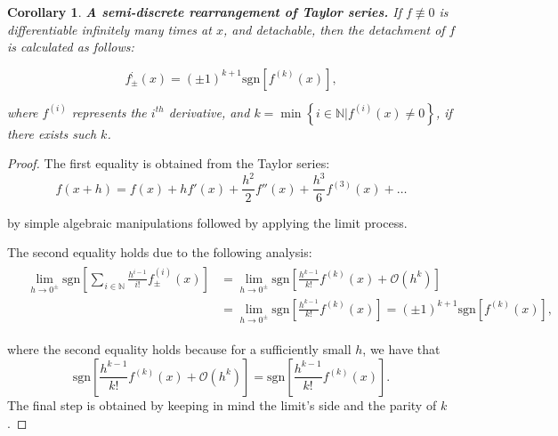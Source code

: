 \documentclass[11pt]{book}
\newtheorem{crl}[thm]{Corollary}
\begin{document}
\begin{crl}\label{taylor}\textbf{A semi-discrete rearrangement of Taylor series.} If $f\not\equiv0$ is differentiable infinitely many times at $x$, and detachable, then the detachment of $f$ is calculated as follows:

$$f_{\pm}^{;}\left(x\right)=\left(\pm1\right)^{k+1}\text{sgn}\left[f^{\left(k\right)}\left(x\right)\right],$$

where $f^{\left(i\right)}$ represents the $i^{th}$ derivative, and $k=\min\left\{ i\in\mathbb{N}|f^{\left(i\right)}\left(x\right)\neq0\right\}$, if there exists such $k$.
\label{semi_discrete_taylor}
\end{crl}
\begin{proof}The first equality is obtained from the Taylor series: $$f(x+h)=f(x)+hf'(x)+\frac{h^{2}}{2}f''(x)+\frac{h^{3}}{6}f^{(3)}(x)+\ldots$$

by simple algebraic manipulations followed by applying the limit process.

The second equality holds due to the following analysis:
\begin{align}
&\begin{aligned}
\underset{{\scriptscriptstyle h\rightarrow0^{\pm}}}{\lim}\text{sgn}\left[\underset{{\scriptscriptstyle i\in\mathbb{N}}}{\overset{}{\sum}}\frac{h^{i-1}}{i!}f_{\pm}^{\left(i\right)}\left(x\right)\right] &= \underset{{\scriptscriptstyle h\rightarrow0^{\pm}}}{\lim}\text{sgn}\left[\frac{h^{k-1}}{k!}f^{\left(k\right)}\left(x\right)+\mathcal{O}\left(h^{k}\right)\right] \\ 
&=\underset{{\scriptscriptstyle h\rightarrow0^{\pm}}}{\lim}\text{sgn}\left[\frac{h^{k-1}}{k!}f^{\left(k\right)}\left(x\right)\right]=\left(\pm1\right)^{k+1}\text{sgn}\left[f^{\left(k\right)}\left(x\right)\right],
\end{aligned}
\end{align}

where the second equality holds because for a sufficiently small $h$, we have that $$\text{sgn}\left[\frac{h^{k-1}}{k!}f^{\left(k\right)}\left(x\right)+\mathcal{O}\left(h^{k}\right)\right]=\text{sgn}\left[\frac{h^{k-1}}{k!}f^{\left(k\right)}\left(x\right)\right].$$
The final step is obtained by keeping in mind the limit’s side and the parity of $k$.
\end{proof}
\end{document}
